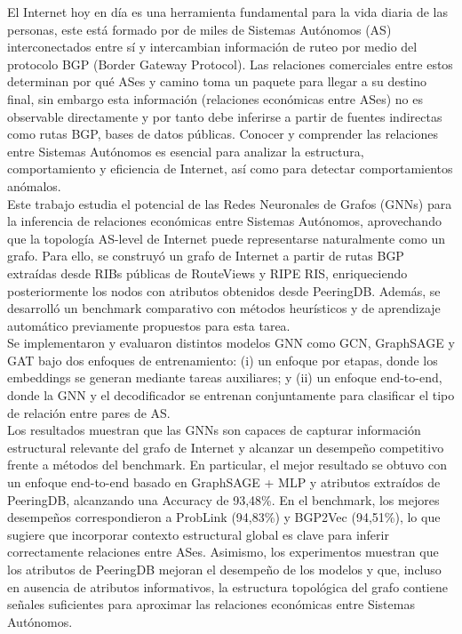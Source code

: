 \documentclass[
	spanish, %
	letterpaper, oneside
]{book}
\begin{document}
\templatePortrait

\templatePagecfg

\begin{abstractd}

	El Internet hoy en día es una herramienta fundamental para la vida diaria de las personas, este está formado 
	por de miles de Sistemas Autónomos (AS) interconectados entre sí y intercambian información de ruteo por medio 
	del protocolo BGP (Border Gateway Protocol). Las relaciones comerciales entre estos determinan por qué ASes y 
	camino toma un paquete para llegar a su destino final, sin embargo esta información (relaciones económicas entre 
	ASes) no es observable directamente y por tanto debe inferirse a partir de fuentes indirectas como rutas BGP, 
	bases de datos públicas. Conocer y comprender las relaciones entre Sistemas Autónomos es esencial para 
	analizar la estructura, comportamiento y eficiencia de Internet, así como para detectar comportamientos 
	anómalos.\\


	Este trabajo estudia el potencial de las Redes Neuronales de Grafos (GNNs) para la inferencia de relaciones 
	económicas entre Sistemas Autónomos, aprovechando que la topología AS-level de Internet puede representarse 
	naturalmente como un grafo. Para ello, se construyó un grafo de Internet a partir de rutas BGP extraídas 
	desde RIBs públicas de RouteViews y RIPE RIS, enriqueciendo posteriormente los nodos con atributos obtenidos 
	desde PeeringDB. Además, se desarrolló un benchmark comparativo con métodos heurísticos y de aprendizaje 
	automático previamente propuestos para esta tarea.\\

    Se implementaron y evaluaron distintos modelos GNN como GCN, GraphSAGE y GAT bajo dos enfoques de entrenamiento: 
	(i) un enfoque por etapas, donde los embeddings se generan mediante tareas auxiliares; 
	y (ii) un enfoque end-to-end, donde la GNN y el decodificador se entrenan conjuntamente para clasificar 
	el tipo de relación entre pares de AS.\\

	Los resultados muestran que las GNNs son capaces de capturar información estructural relevante del grafo de 
	Internet y alcanzar un desempeño competitivo frente a métodos del benchmark. En particular, el mejor resultado 
	se obtuvo con un enfoque end-to-end basado en GraphSAGE + MLP y atributos extraídos de PeeringDB, alcanzando una 
	Accuracy de 93,48\%. 
	En el benchmark, los mejores desempeños correspondieron a ProbLink (94,83\%) y BGP2Vec (94,51\%), lo que sugiere 
	que incorporar contexto estructural global es clave para inferir correctamente relaciones entre ASes. Asimismo, 
	los experimentos muestran que los atributos de PeeringDB mejoran el desempeño de los modelos y que, incluso en 
	ausencia de atributos informativos, la estructura topológica del grafo contiene señales suficientes para aproximar 
	las relaciones económicas entre Sistemas Autónomos.\\


    

\end{abstractd}
\end{document}
